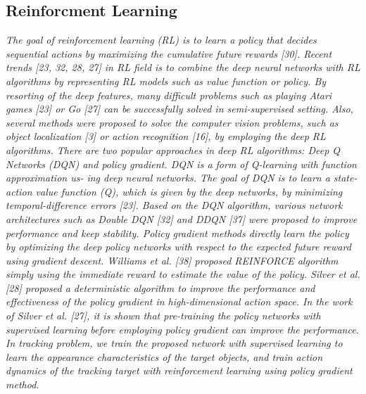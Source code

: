 \subsection{Reinforcment Learning}
\textit{The goal of reinforcement learning (RL) is to learn a policy that decides sequential actions by maximizing the cumulative future rewards [30]. Recent trends [23, 32, 28, 27] in RL field is to combine the deep neural networks with RL algorithms by representing RL models such as value function or policy. By resorting of the deep features, many difficult problems such as playing Atari games [23] or Go [27] can be successfully solved in semi-supervised setting. Also, several methods were proposed to solve the computer vision problems, such as object localization [3] or action recognition [16], by employing the deep RL algorithms.
There are two popular approaches in deep RL algorithms: Deep Q Networks (DQN) and policy gradient. DQN is a form of Q-learning with function approximation us- ing deep neural networks. The goal of DQN is to learn a state-action value function (Q), which is given by the deep networks, by minimizing temporal-difference errors [23]. Based on the DQN algorithm, various network architectures such as Double DQN [32] and DDQN [37] were proposed to improve performance and keep stability.
Policy gradient methods directly learn the policy by optimizing the deep policy networks with respect to the expected future reward using gradient descent. Williams et al. [38] proposed REINFORCE algorithm simply using the immediate reward to estimate the value of the policy. Silver et al. [28] proposed a deterministic algorithm to improve the performance and effectiveness of the policy gradient in high-dimensional action space. In the work of Silver et al. [27], it is shown that pre-training the policy networks with supervised learning before employing policy gradient can improve the performance. In tracking problem, we train the proposed network with supervised learning to learn the appearance characteristics of the target objects, and train action dynamics of the tracking target with reinforcement learning using policy gradient method.}
